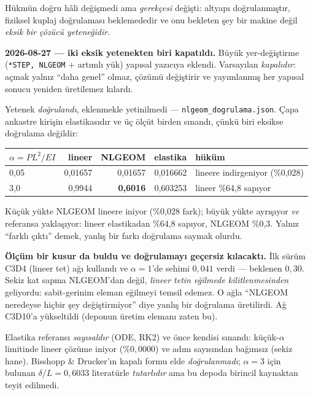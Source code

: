 \documentclass[11pt,a4paper]{article}
\begin{document}
\begin{description}
        Hükmün doğru hâli değişmedi ama \emph{gerekçesi} değişti:
        altyapı doğrulanmıştır, fiziksel kuplaj doğrulaması beklemededir ve
        onu bekleten şey bir makine değil \emph{eksik bir çözücü
        yeteneğidir}.

        \textbf{2026-08-27 --- iki eksik yetenekten biri kapatıldı.}
        Büyük yer-değiştirme (\texttt{*STEP, NLGEOM} + artımlı yük)
        yapısal yazıcıya eklendi. Varsayılan \emph{kapalıdır}: açmak yalnız
        ``daha genel'' olmaz, çözümü değiştirir ve yayımlanmış her yapısal
        sonucu yeniden üretilemez kılardı.

        Yetenek \emph{doğrulandı}, eklenmekle yetinilmedi ---
        \texttt{nlgeom\_dogrulama.json}. Çapa ankastre kirişin elastikasıdır
        ve üç ölçüt birden sınandı, çünkü biri eksikse doğrulama değildir:

\begin{center}\footnotesize
\begin{tabular}{@{}lrrrl@{}}
\toprule
$\alpha = PL^2/EI$ & lineer & NLGEOM & elastika & hüküm \\
\midrule
0{,}05 & 0{,}01657 & 0{,}01657 & 0{,}016662 & lineere indirgeniyor (\%0{,}028) \\
3{,}0 & 0{,}9944 & \textbf{0{,}6016} & 0{,}603253 & lineer \%64{,}8 sapıyor \\
\bottomrule
\end{tabular}
\end{center}

        \noindent Küçük yükte NLGEOM lineere iniyor (\%0{,}028 fark);
        büyük yükte ayrışıyor \emph{ve} referansa yaklaşıyor: lineer
        elastikadan \%64{,}8 sapıyor, NLGEOM \%0{,}3. Yalnız
        ``farklı çıktı'' demek, yanlış bir farkı doğrulama saymak olurdu.

        \textbf{Ölçüm bir kusur da buldu ve doğrulamayı geçersiz kılacaktı.}
        İlk sürüm C3D4 (lineer tet) ağı kullandı ve $\alpha{=}1$'de sehimi
        $0{,}041$ verdi --- beklenen $0{,}30$. Sekiz kat sapma NLGEOM'dan
        değil, \emph{lineer tetin eğilmede kilitlenmesinden} geliyordu:
        sabit-gerinim eleman eğilmeyi temsil edemez. O ağla ``NLGEOM neredeyse
        hiçbir şey değiştirmiyor'' diye yanlış bir doğrulama üretilirdi. Ağ
        C3D10'a yükseltildi (deponun üretim elemanı zaten bu).

        \noindent Elastika referansı \emph{sayısaldır} (ODE, RK2) ve önce
        kendisi sınandı: küçük-$\alpha$ limitinde lineer çözüme iniyor
        ($\%0{,}0000$) ve adım sayısından bağımsız (sekiz hane).
        Bisshopp \& Drucker'ın kapalı formu elde \emph{doğrulanmadı};
        $\alpha{=}3$ için bulunan $\delta/L = 0{,}6033$ literatürle
        \emph{tutarlıdır} ama bu depoda birincil kaynaktan teyit edilmedi.


\end{description}
\end{document}

